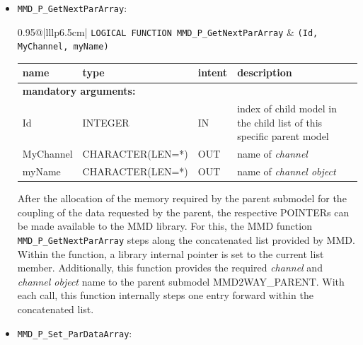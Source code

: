 \documentclass[twoside]{article}
\begin{document}
\begin{itemize}
\item  \verb|MMD_P_GetNextParArray|:\\
\vspace*{-0.3cm}

\begin{tabular*}{0.95\textwidth}{@{\extracolsep\fill}|lllp{6.5cm}|}
\hline
{}
{\tt LOGICAL FUNCTION MMD\_P\_GetNextParArray} &
{\tt (Id, MyChannel, myName)}\\
\hline
\end{tabular*}
\begin{tabular*}{0.95\textwidth}{@{\extracolsep\fill}|lllp{6.5cm}|}
name & type & intent & description\\
\hline
\multicolumn{4}{|l|}{\bf mandatory arguments:}\\
Id & {\footnotesize INTEGER} & IN &  index of child model in the child list of this specific parent model\\
 MyChannel & CHARACTER(LEN=*) & OUT & name of {\it channel}  \\
myName     &  CHARACTER(LEN=*) & OUT & name of {\it channel object} \\
\hline
\end{tabular*}
\smallskip

After the allocation of the memory required by the parent submodel for
the coupling of the data requested by the parent, the  
respective {\footnotesize POINTER}s can be made available to the MMD
library.
For this, the MMD function \verb|MMD_P_GetNextParArray| steps along
the concatenated list provided by MMD. Within the function, a library
internal pointer is set to the current list member. Additionally, this
function provides the required {\it channel} and {\it channel object}
name to the parent submodel  
MMD2WAY\_PARENT. With each call, this function internally steps one entry 
forward within the concatenated list.


\item  \verb|MMD_P_Set_ParDataArray|:\\
\vspace*{-0.3cm}


\end{itemize}
\end{document}

